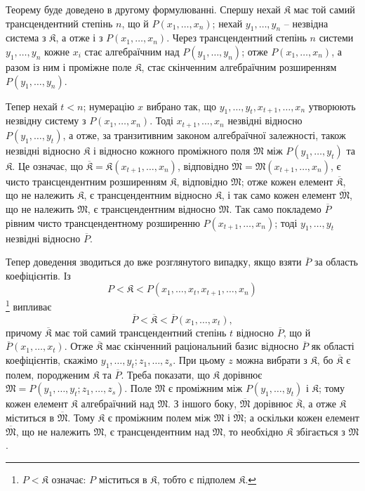 \documentclass[11pt]{article}
\begin{document}
Теорему буде доведено в другому формулюванні. Спершу нехай $\mathfrak K$ має той самий трансцендентний степінь $n$, що й $P(x_1,\ldots,x_n)$; нехай $y_1,\ldots,y_n$ -- незвідна система з $\mathfrak K$, а отже і з $P(x_1,\ldots,x_n)$. Через трансцендентний степінь $n$ системи $y_1,\ldots,y_n$ кожне $x_i$ стає алгебраїчним над $P(y_1,\ldots,y_n)$; отже $P(x_1,\ldots,x_n)$, а разом із ним і проміжне поле $\mathfrak K$, стає скінченним алгебраїчним розширенням $P(y_1,\ldots,y_n)$.

Тепер нехай $t<n$; нумерацію $x$ вибрано так, що $y_1,\ldots,y_t,x_{t+1},\ldots,x_n$ утворюють незвідну систему з $P(x_1,\ldots,x_n)$. Тоді $x_{t+1},\ldots,x_n$ незвідні відносно $P(y_1,\ldots,y_t)$, а отже, за транзитивним законом алгебраїчної залежності, також незвідні відносно $\mathfrak K$ і відносно кожного проміжного поля $\mathfrak M$ між $P(y_1,\ldots,y_t)$ та $\mathfrak K$. Це означає, що $\overline{\mathfrak K}=\mathfrak K(x_{t+1},\ldots,x_n)$, відповідно $\overline{\mathfrak M}=\mathfrak M(x_{t+1},\ldots,x_n)$, є чисто трансцендентним розширенням $\mathfrak K$, відповідно $\mathfrak M$; отже кожен елемент $\overline{\mathfrak K}$, що не належить $\mathfrak K$, є трансцендентним відносно $\mathfrak K$, і так само кожен елемент $\overline{\mathfrak M}$, що не належить $\mathfrak M$, є трансцендентним відносно $\mathfrak M$. Так само покладемо $\overline P$ рівним чисто трансцендентному розширенню $P(x_{t+1},\ldots,x_n)$; тоді $y_1,\ldots,y_t$ незвідні відносно $\overline P$.

Тепер доведення зводиться до вже розглянутого випадку, якщо взяти $\overline P$ за область коефіцієнтів. Із
\[
P<\mathfrak K<P(x_1,\ldots,x_t,x_{t+1},\ldots,x_n)
\]
\footnote{$P<\mathfrak K$ означає: $P$ міститься в $\mathfrak K$, тобто є підполем $\mathfrak K$.} випливає
\[
\overline P<\overline{\mathfrak K}<\overline P(x_1,\ldots,x_t),
\]
причому $\overline{\mathfrak K}$ має той самий трансцендентний степінь $t$ відносно $\overline P$, що й $\overline P(x_1,\ldots,x_t)$. Отже $\overline{\mathfrak K}$ має скінченний раціональний базис відносно $\overline P$ як області коефіцієнтів, скажімо $y_1,\ldots,y_t; z_1,\ldots,z_s$. При цьому $z$ можна вибрати з $\mathfrak K$, бо $\overline{\mathfrak K}$ є полем, породженим $\mathfrak K$ та $\overline P$. Треба показати, що $\mathfrak K$ дорівнює $\mathfrak M=P(y_1,\ldots,y_t;z_1,\ldots,z_s)$. Поле $\mathfrak M$ є проміжним між $P(y_1,\ldots,y_t)$ і $\mathfrak K$; тому кожен елемент $\mathfrak K$ алгебраїчний над $\mathfrak M$. З іншого боку, $\overline{\mathfrak M}$ дорівнює $\overline{\mathfrak K}$, а отже $\mathfrak K$ міститься в $\overline{\mathfrak M}$. Тому $\mathfrak K$ є проміжним полем між $\mathfrak M$ і $\overline{\mathfrak M}$; а оскільки кожен елемент $\overline{\mathfrak M}$, що не належить $\mathfrak M$, є трансцендентним над $\mathfrak M$, то необхідно $\mathfrak K$ збігається з $\mathfrak M$.
\end{document}
